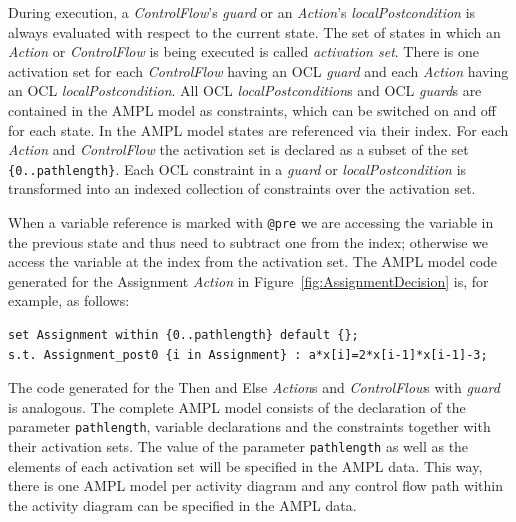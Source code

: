 \documentclass[runningheads,a4paper]{llncs}%
\newcommand{\UMLType}[1]{\textsf{\textit{#1}}} %
\newcommand{\UMLReference}[1]{\textsf{\textit{#1}}} %
\newcommand{\AMPLCode}[1]{\texttt{#1}}
\begin{document}
During execution, a \UMLType{ControlFlow}'s \UMLReference{guard} or an
\UMLType{Action}'s \UMLReference{localPostcondition} is always evaluated with
respect to the current state. The set of states in which an \UMLType{Action} or
\UMLType{ControlFlow} is being executed is called \emph{activation set}. There
is one activation set for each \UMLType{ControlFlow} having an OCL
\UMLReference{guard} and each \UMLType{Action} having an OCL
\UMLReference{localPostcondition}. All OCL \UMLReference{localPostcondition}s
and OCL \UMLReference{guard}s are contained in the AMPL model as constraints,
which can be switched on and off for each state. In the AMPL model states are
referenced via their index. For each \UMLType{Action} and \UMLType{ControlFlow}
the activation set is declared as a subset of the set
\AMPLCode{\{0..pathlength\}}. Each OCL constraint in a \UMLReference{guard} or
\UMLReference{localPostcondition} is transformed into an indexed collection of
constraints over the activation set.

When a variable reference is marked with \verb=@pre= we are accessing the
variable in the previous state and thus need to subtract one from the index;
otherwise we access the variable at the index from the activation set. The AMPL
model code generated for the Assignment \UMLType{Action} in
Figure~\ref{fig:AssignmentDecision} is, for example, as follows:%
\begin{lstlisting}[basicstyle=\ttfamily,language=ampl,breaklines=true]
set Assignment within {0..pathlength} default {};
s.t. Assignment_post0 {i in Assignment} : a*x[i]=2*x[i-1]*x[i-1]-3;
\end{lstlisting}
The code generated for the Then and Else \UMLType{Action}s and
\UMLType{ControlFlow}s with \UMLReference{guard} is analogous. The complete AMPL
model consists of the declaration of the parameter \AMPLCode{pathlength},
variable declarations and the constraints together with their activation sets.
The value of the parameter \AMPLCode{pathlength} as well as the elements of each
activation set will be specified in the AMPL data. This way, there is one AMPL
model per activity diagram and any control flow path within the activity diagram
can be specified in the AMPL data.
\end{document}
